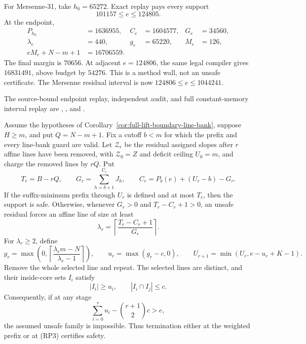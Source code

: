 \documentclass[11pt,a4paper]{amsart}
\numberwithin{equation}{section}
\theoremstyle{remark}
\begin{document}
\begin{remark}
For Mersenne-31, take \(h_0=65272\).  Exact replay pays every support
\[
 101157\le e\le124805.
\]
At the endpoint,
\[
 \begin{aligned}
 P_{h_0}&=1636955,& C_e&=1604577,&G_e&=34560,\\
 \lambda_e&=440,&g_e&=65220,&M_e&=126,\\
 eM_e+N-m+1&=16706559.
 \end{aligned}
\]
The final margin is \(70656\).  At adjacent \(e=124806\), the same legal
compiler gives \(16831491\), above budget by \(54276\).  This is a method
wall, not an unsafe certificate.  The Mersenne residual interval is now
\(124806\le e\le1044241\).

The source-bound endpoint replay, independent audit, and full
constant-memory interval replay are
,
,
and
.
\end{remark}

\begin{corollary}
\label{cor:full-lift-recursive-line-peeling}
Assume the hypotheses of
Corollary~\ref{cor:full-lift-boundary-line-bank}, suppose \(H\ge m\), and
put \(Q=N-m+1\).  Fix a cutoff \(b<m\) for which the prefix and every
line-bank guard are valid.  Let \(\mathcal Z_r\) be the residual assigned
slopes after \(r\) affine lines have been removed, with
\(\mathcal Z_0=Z\) and deficit ceiling \(U_0=m\), and charge the removed
lines by \(rQ\).
Put
\[
 T_r=B-rQ,\qquad
 G_r=\sum_{h=b+1}^{U_r}J_h,\qquad
 C_r=P_b(e)+(U_r-b)-G_r.
\]
If the suffix-minimum prefix through \(U_r\) is defined and at most \(T_r\),
then the support is safe.  Otherwise, whenever \(G_r>0\) and
\(T_r-C_r+1>0\), an unsafe residual forces an affine line of size at least
\[
 \lambda_r=\left\lceil\frac{T_r-C_r+1}{G_r}\right\rceil.       \tag{RP1}
\]
For \(\lambda_r\ge2\), define
\[
 g_r=\max\left(0,
       \left\lceil\frac{\lambda_rm-N}{\lambda_r-1}\right\rceil\right),
 \qquad u_r=\max(g_r-c,0),
 \qquad U_{r+1}=\min(U_r,e-u_r+K-1).             \tag{RP2}
\]
Remove the whole selected line and repeat.  The selected lines are distinct,
and their inside-core sets \(I_i\) satisfy
\[
 |I_i|\ge u_i,\qquad |I_i\cap I_j|\le c.
\]
Consequently, if at any stage
\[
 \sum_{i=0}^{r}u_i-\binom{r+1}{2}c>e,             \tag{RP3}
\]
the assumed unsafe family is impossible.  Thus termination either at the
weighted prefix or at (RP3) certifies safety.
\end{corollary}
\end{document}

